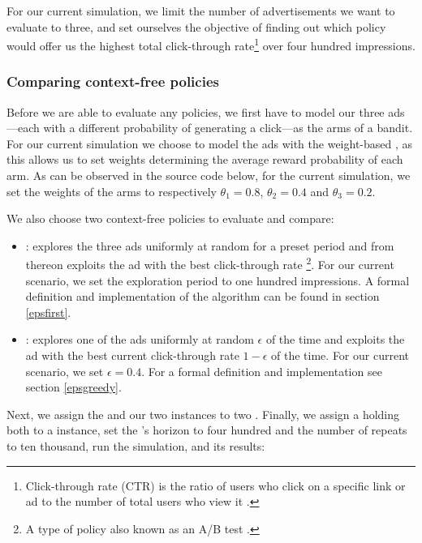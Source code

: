 \documentclass{jss}
\begin{document}
For our current simulation, we limit the number of advertisements we want to evaluate to three, and set ourselves the objective of finding out which policy would offer us the highest total click-through rate\footnote{Click-through rate (CTR) is the ratio of users who click on a specific link or ad to the number of total users who view it \citep{Briggs1997}.} over four hundred impressions.

\subsubsection{Comparing context-free policies} \label{ncp}

Before we are able to evaluate any policies, we first have to model our three ads---each with a different probability of generating a click---as the arms of a bandit. For our current simulation we choose to model the ads with the weight-based , as this allows us to set weights determining the average reward probability of each arm. As can be observed in the source code below, for the current simulation, we set the weights of the arms to respectively $\theta_1 = 0.8$, $\theta_2  = 0.4$ and $\theta_3 = 0.2$.

We also choose two context-free policies to evaluate and compare:

\begin{itemize}
         \item {}: explores the three ads uniformly at random for a preset period and from thereon exploits the ad with the best click-through rate \footnote{A type of policy also known as an A/B test \cite{Kohavi2007}.}. For our current scenario, we set the exploration period to one hundred impressions. A formal definition and implementation of the algorithm can be found in section \ref{epsfirst}.

         \item {}: explores one of the ads uniformly at random $\epsilon$ of the time and exploits the ad with the best current click-through rate $1 - \epsilon$ of the time. For our current scenario, we set $\epsilon = 0.4$. For a formal definition and implementation see section \ref{epsgreedy}.
\end{itemize}

Next, we assign the  and our two  instances to two . Finally, we assign a  holding both  to a  instance, set the 's horizon to four hundred and the number of repeats to ten thousand, run the simulation, and  its results:
\end{document}
